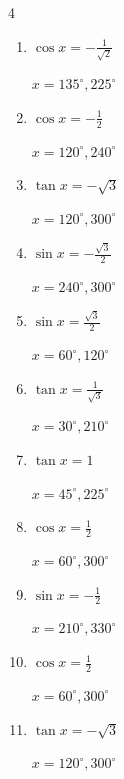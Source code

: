 \begin{multicols}{4}
\begin{enumerate}
        $\displaystyle x = 30^{\circ} , 330^{\circ}$

\columnbreak %

  \item $\displaystyle \cos{x}  = -\frac{1}{\sqrt{2}}$

        $\displaystyle x = 135^{\circ} , 225^{\circ}$

  \item $\displaystyle \cos{x}  = -\frac{1}{2}$

        $\displaystyle x = 120^{\circ} , 240^{\circ}$

  \item $\displaystyle \tan{x}  = -\sqrt{3}$

        $\displaystyle x = 120^{\circ} , 300^{\circ}$

  \item $\displaystyle \sin{x}  = -\frac{\sqrt{3}}{2}$

        $\displaystyle x = 240^{\circ} , 300^{\circ}$

  \item $\displaystyle \sin{x}  = \frac{\sqrt{3}}{2}$

        $\displaystyle x = 60^{\circ} , 120^{\circ}$

  \item $\displaystyle \tan{x}  = \frac{1}{\sqrt{3}}$

        $\displaystyle x = 30^{\circ} , 210^{\circ}$

  \item $\displaystyle \tan{x}  = 1$

        $\displaystyle x = 45^{\circ} , 225^{\circ}$

  \item $\displaystyle \cos{x}  = \frac{1}{2}$

        $\displaystyle x = 60^{\circ} , 300^{\circ}$

  \item $\displaystyle \sin{x}  = -\frac{1}{2}$

        $\displaystyle x = 210^{\circ} , 330^{\circ}$

  \item $\displaystyle \cos{x}  = \frac{1}{2}$

        $\displaystyle x = 60^{\circ} , 300^{\circ}$

  \item $\displaystyle \tan{x}  = -\sqrt{3}$

        $\displaystyle x = 120^{\circ} , 300^{\circ}$


\end{enumerate}
\end{multicols}
